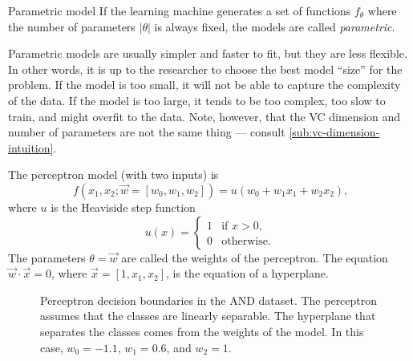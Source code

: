 \begin{definition}{Parametric model}\label{def:parametric}
  If the learning machine generates a set of functions $f_\theta$ where the number of
  parameters $|\theta|$ is always fixed, the models are called \emph{parametric}.
\end{definition}

Parametric models are usually simpler and faster to fit, but they are less flexible.  In
other words, it is up to the researcher to choose the best model ``size'' for the problem.
If the model is too small, it will not be able to capture the complexity of the data.  If
the model is too large, it tends to be too complex, too slow to train, and might overfit to
the data.  Note, however, that the VC dimension and number of parameters are not the same
thing --- consult \cref{sub:vc-dimension-intuition}.

The perceptron model (with two inputs) is
\begin{equation*}
  f(x_1, x_2; \vec{w} = \left[w_0, w_1, w_2\right]) = u(w_0 + w_1 x_1 + w_2 x_2)\text{,}
\end{equation*}
where $u$ is the Heaviside step function
\begin{equation*}
  u(x) = \begin{cases}
    1 & \text{if } x > 0\text{,} \\
    0 & \text{otherwise.}
  \end{cases}
\end{equation*}
The parameters $\theta = \vec{w}$ are called the weights of the perceptron.
The equation $\vec{w} \cdot \vec{x} = 0$, where $\vec{x} = [1, x_1,
x_2]$, is the equation of a hyperplane.

\begin{figure}
  \centering
  \caption{
  Perceptron decision boundaries in the AND dataset.
  The perceptron assumes that the classes are linearly separable.
  The hyperplane that separates the classes comes from the weights of the model.
  In this case, $w_0 = -1.1$, $w_1 = 0.6$, and $w_2 = 1$.
  }
  \label{fig:perceptron-and}
\end{figure}


